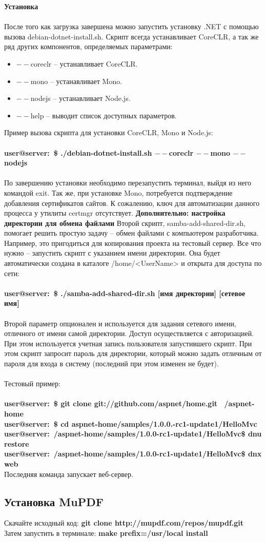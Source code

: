 \documentclass[12pt,a4paper,titlepage]{article}
\begin{document}
\begin{itemize}
\textbf{Установка}\\\\
После того как загрузка завершена можно запустить установку .NET с помощью вызова debian-dotnet-install.sh. Скрипт всегда устанавливает CoreCLR, а так же ряд других компонентов, определяемых параметрами:
	\begin{itemize}
		\item $--$coreclr – устанавливает CoreCLR.
		\item $--$mono – устанавливает Mono.
		\item $--$nodejs – устанавливает Node.js.
		\item $--$help – выводит список доступных параметров.
	\end{itemize}
\end{itemize}
Пример вызова скрипта для установки CoreCLR, Mono и Node.js:\\\\
\textbf{user@server:~\$ ./debian-dotnet-install.sh $--$coreclr $--$mono $--$nodejs}\\\\
По завершению установки необходимо перезапустить терминал, выйдя из него командой exit. Так же, при установке Mono, потребуется подтверждение добавления сертификатов сайтов. К сожалению, ключ для автоматизации данного процесса у утилиты certmgr отсутствует.
\textbf{Дополнительно: настройка директории для обмена файлами}
Второй скрипт, samba-add-shared-dir.sh, помогает решить простую задачу – обмен файлами с компьютером разработчика. Например, это пригодиться для копирования проекта на тестовый сервер. Все что нужно – запустить скрипт с указанием имени директории. Она будет автоматически создана в каталоге /home/<UserName> и открыта для доступа по сети:\\\\
\textbf{user@server:~\$ ./samba-add-shared-dir.sh [имя директории] [сетевое имя]}\\\\
Второй параметр опционален и используется для задания сетевого имени, отличного от имени самой директории. Доступ осуществляется с авторизацией. При этом используется учетная запись пользователя запустившего скрипт. При этом скрипт запросит пароль для директории, который можно задать отличным от пароля для входа в систему (последний при этом изменен не будет).
\\\\Тестовый пример:\\\\
\textbf{user@server:~\$ git clone git://github.com/aspnet/home.git ~/aspnet-home\\
user@server:~\$ cd aspnet-home/samples/1.0.0.-rc1-update1/HelloMvc\\
user@server:~/aspnet-home/samples/1.0.0-rc1-update1/HelloMvc\$ dnu restore\\
user@server:~/aspnet-home/samples/1.0.0-rc1-update1/HelloMvc\$ dnx web}\\
Последняя команда запускает веб-сервер.
\subsection{Установка MuPDF}
Скачайте исходный код: \textbf{git clone http://mupdf.com/repos/mupdf.git}
Затем запустить в терминале: \textbf{make prefix=/usr/local install}
\end{document}
